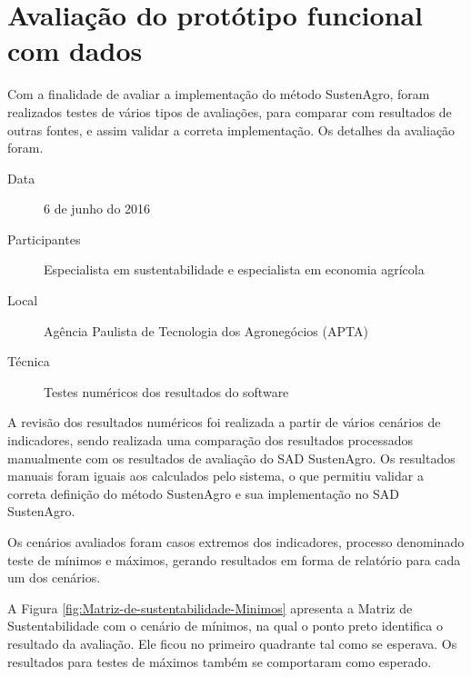 \section{Avaliação do protótipo funcional com dados}

Com a finalidade de avaliar a implementação do método SustenAgro,
foram realizados testes de vários tipos de avaliações, para comparar
com resultados de outras fontes, e assim validar a correta implementação.
Os detalhes da avaliação foram.
\begin{description}
\item [{Data}] 6 de junho do 2016
\item [{Participantes}] Especialista em sustentabilidade e especialista
em economia agrícola
\item [{Local}] Agência Paulista de Tecnologia dos Agronegócios (APTA)
\item [{Técnica}] Testes numéricos dos resultados do software
\end{description}
A revisão dos resultados numéricos foi realizada a partir de vários
cenários de indicadores, sendo realizada uma comparação dos resultados
processados manualmente com os resultados de avaliação do SAD SustenAgro.
Os resultados manuais foram iguais aos calculados pelo sistema, o
que permitiu validar a correta definição do método SustenAgro e sua
implementação no SAD SustenAgro. 

Os cenários avaliados foram casos extremos dos indicadores, processo
denominado teste de mínimos e máximos, gerando resultados em forma
de relatório para cada um dos cenários. 

A Figura \ref{fig:Matriz-de-sustentabilidade-Minimos} apresenta a
Matriz de Sustentabilidade com o cenário de mínimos, na qual o ponto
preto identifica o resultado da avaliação. Ele ficou no primeiro quadrante
tal como se esperava. Os resultados para testes de máximos também
se comportaram como esperado.


